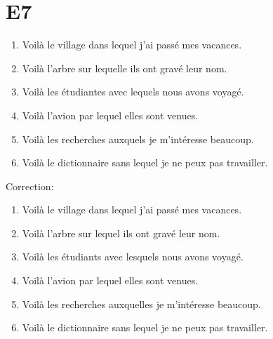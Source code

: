 \documentclass{book}
\begin{document}
    \section{E7}
        \begin{enumerate}
            \item Voilà le village dans lequel j'ai passé mes vacances.
            \item Voilà l'arbre sur lequelle ils ont gravé leur nom.
            \item Voilà les étudiantes avec lequels nous avons voyagé.
            \item Voilà l'avion par lequel elles sont venues.
            \item Voilà les recherches auxquels je m'intéresse beaucoup.
            \item Voilà le dictionnaire sans lequel je ne peux pas travailler.
        \end{enumerate}
        Correction:
        \begin{enumerate}
            \item Voilà le village dans lequel j'ai passé mes vacances.
            \item Voilà l'arbre sur lequel ils ont gravé leur nom.
            \item Voilà les étudiants avec lesquels nous avons voyagé.
            \item Voilà l'avion par lequel elles sont venues.
            \item Voilà les recherches auxquelles je m'intéresse beaucoup.
            \item Voilà le dictionnaire sans lequel je ne peux pas travailler.
        \end{enumerate}
\end{document}
